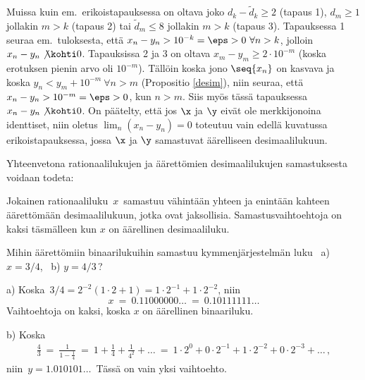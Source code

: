 Muissa kuin em.\ erikoistapauksessa on oltava joko $d_k-\tilde{d}_k \ge 2$ (tapaus 1),
$d_m \ge 1$ jollakin $m>k$ (tapaus 2) tai $\tilde{d}_m \le 8$ jollakin $m>k$ (tapaus 3). 
Tapauksessa 1 seuraa em.\ tuloksesta, että $x_n-y_n > 10^{-k}=\eps>0\ \forall n>k$, jolloin 
$x_n-y_n \not\kohti 0$. Tapauksissa 2 ja 3 on oltava $x_m-y_m \ge 2 \cdot 10^{-m}$
(koska erotuksen pienin arvo oli $10^{-m}$). Tällöin koska jono $\seq{x_n}$ on kasvava
ja koska $y_n < y_m + 10^{-m}\ \forall n>m$ (Propositio \ref{desim}), niin seuraa, että
$x_n-y_n > 10^{-m}=\eps>0$, kun $n>m$. Siis myös tässä tapauksessa $x_n-y_n \not\kohti 0$.
On päätelty, että jos $\x$ ja $\y$ eivät ole merkkijonoina identtiset, niin oletus
$\lim_n(x_n-y_n)=0$ toteutuu vain edellä kuvatussa erikoistapauksessa, jossa $\x$ ja $\y$ 
samastuvat äärelliseen desimaalilukuun. \loppu

Yhteenvetona rationaalilukujen ja äärettömien desimaalilukujen samastuksesta voidaan todeta:
\begin{Kor} \label{rat ja desim samastus} Jokainen rationaaliluku $\,x\,$ samastuu vähintään
yhteen ja enintään kahteen äärettömään desimaalilukuun, jotka ovat jaksollisia.
Samastusvaihtoehtoja on kaksi täsmälleen kun $x$ on äärellinen desimaaliluku. \end{Kor}
\begin{Exa} Mihin äärettömiin binaarilukuihin samastuu kymmenjärjestelmän luku \ 
a) $x = 3/4$, \ b) $y=4/3$\,? 
\end{Exa}
\ratk a) Koska $\,3/4 = 2^{-2}(1 \cdot 2 + 1) = 1 \cdot 2^{-1} + 1 \cdot 2^{-2}$, niin
\[
x\ =\ 0.11000000 \ldots \ =\ 0.10111111 \ldots
\]
Vaihtoehtoja on kaksi, koska $x$ on äärellinen binaariluku.
 
b) Koska
\begin{align*}
\frac{4}{3}\ =\ \frac{1}{1-\frac{1}{4}}\
             =\ 1+\frac{1}{4}+\frac{1}{4^2}+\ldots\ 
             =\ 1 \cdot 2^0 + 0 \cdot 2^{-1} +1 \cdot 2^{-2} + 0 \cdot 2^{-3} + \ldots\,,
\end{align*}
niin $\,y=1.010101\ldots\,$ Tässä on vain yksi vaihtoehto. \loppu

